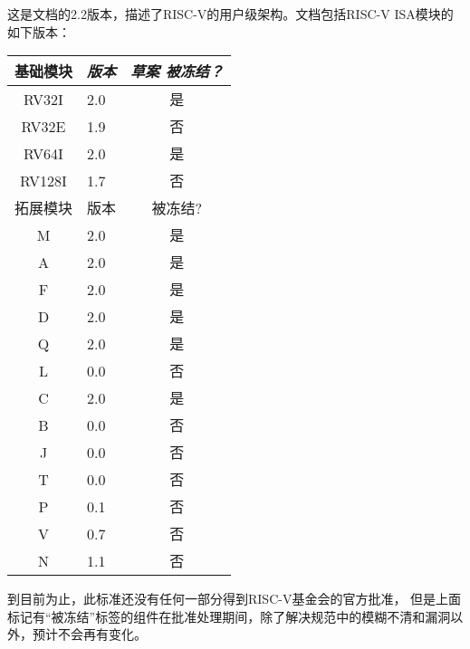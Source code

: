 这是文档的2.2版本，描述了RISC-V的用户级架构。文档包括RISC-V ISA模块的如下版本：
\begin{table}[hbt]
  \centering
  \begin{tabular}{|c|l|c|}
    \hline
    基础模块     & \em 版本 & \em 草案 被冻结？ \\
    \hline
    RV32I    & 2.0 & 是 \\
    RV32E    & 1.9 & 否 \\
    RV64I    & 2.0 & 是 \\
    RV128I   & 1.7 & 否 \\
    \hline
    拓展模块 & 版本 & 被冻结? \\
    \hline
    M        & 2.0 & 是 \\
    A        & 2.0 & 是 \\
    F        & 2.0 & 是 \\
    D        & 2.0 & 是 \\
    Q        & 2.0 & 是 \\
    L        & 0.0 & 否 \\
    C        & 2.0 & 是 \\
    B        & 0.0 & 否 \\
    J        & 0.0 & 否 \\
    T        & 0.0 & 否 \\
    P        & 0.1 & 否 \\
    V        & 0.7 & 否 \\
    N        & 1.1 & 否 \\
    \hline
  \end{tabular}
\end{table}

到目前为止，此标准还没有任何一部分得到RISC-V基金会的官方批准，
但是上面标记有“被冻结”标签的组件在批准处理期间，除了解决规范中的模糊不清和漏洞以外，预计不会再有变化。


